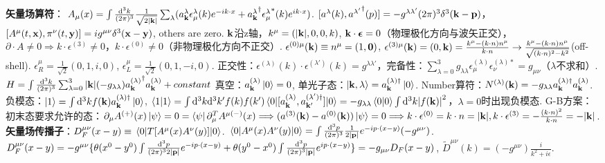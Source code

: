 \documentclass[11pt]{article}
\renewcommand{\bm}[1]{\boldsymbol{#1}}
\newcommand{\vbp}{\vb{p}}
\newcommand{\vbk}{\vb{k}}
\newcommand{\la}{\lambda}
\newcommand{\pa}{\partial}
\begin{document}
{\bf 矢量场算符}： $A_{\mu}(x)=\int\frac{\dd^3k}{(2\pi)^3}\frac{1}{\sqrt{2\abs{\vb{k}}}}\sum_{\la}(a^{\la}_{\vbk}\epsilon^{\la}_{\mu}(k)e^{-ik\cdot x}+{a^{\la}_{\vbk}}^{\dagger}{\epsilon^{\la}_{\mu}}^*(k)e^{ik\cdot x})$. $[a^{\la}(k),{a^{\la'}}^{\dagger}(p)]=-g^{\la\la'}(2\pi)^3\delta^3(\vb{k-p})$，$[A^{\mu}(t,\vb{x}),\pi^{\nu}(t,\vb{y})]=ig^{\mu\nu}\delta^3(\vb{x-y})$, others are zero.  $\vb{k}$沿z轴，$k^{\mu}=(\abs{\vbk},0,0,k)$, $\vbk\cdot\bm{\epsilon}=0$（物理极化方向与波矢正交），$\pa\cdot A\neq0\Longrightarrow k\cdot\epsilon^{(3)}\neq0，k\cdot\epsilon^{(0)}\neq0$（非物理极化方向不正交）. $\epsilon^{(0)\mu}(\vbk)\equiv n^{\mu}=(1,\vb{0})$, $\epsilon^{(3)\mu}(\vbk)=(0,\vbk)=\frac{k^{\mu}-(k\cdot n)n^{\mu}}{k\cdot n}\rightarrow\frac{k^{\mu}-(k\cdot n)n^{\mu}}{\sqrt{(k\cdot n)^2-k^2}}$(off-shell). $\epsilon_R^{\mu}=\frac{1}{\sqrt{2}}(0,1,i,0)$, $\epsilon_L^{\mu}=\frac{1}{\sqrt{2}}(0,1,-i,0)$.
正交性：$\epsilon^{(\la)}(k)\cdot\epsilon^{(\la')}(k)=g^{\la\la'}$，完备性：$\sum_{\la=0}^3g_{\la\la}\epsilon^{(\la)}_{\mu}\epsilon^{(\la)*}_{\nu}=g_{\mu\nu}$（$\la$不求和）.
$H=\int\frac{\dd^3k}{(2\pi)^3}\sum_{\la=0}^3\abs{\vbk}(-g_{\la\la}){a^{(\la)}_{\vbk}}^{\dagger}a^{(\la)}_{\vbk}+constant$
真空：$a^{(\la)}_{\vbk}\ket{0}=0$, 单光子态：$\ket{\vbk,\la}=a^{(\la)\dagger}_{\vbk}\ket{0}$. Number算符：$N^{(\la)}(\vbk)=-g_{\la\la}a^{(\la)\dagger}_{\vbk}a^{(\la)}_{\vbk}$.
负模态：$\ket{1}=\int\dd^3kf(\vbk)a^{(\la)\dagger}_{\vbk}\ket{0}$, $\braket{1}{1}=\int\dd^3k\dd^3k'f(k)f(k')\mel{0}{[a^{(\la)}_{\vbk},a^{(\la')\dagger}_{\vbk'}]}{0}=-g_{\la\la}\braket{0}{0}\int\dd^3k\abs{f(\vbk)}^2$，$\la=0$时出现负模态.
G-B方案：初末态要求允许的态：$\pa_{\mu}A^{(+)}(x)\ket{\psi}=0=\bra{\psi}\pa_{\mu}^TA^{\mu(-)}(x)\Longrightarrow(a^{(3)}(\vbk)-a^{(0)}(\vbk))\ket{\psi}=0\Longrightarrow k\cdot\epsilon^{(0)}=k\cdot n=\abs{\vbk},k\cdot\epsilon^{(3)}=-\frac{(k\cdot n)^2}{k\cdot n}=-\abs{\vbk}$.
{\bf 矢量场传播子}：$D^{\mu\nu}_F(x-y)\equiv\mel{0}{T[A^{\mu}(x)A^{\nu}(y)]}{0}$. $\mel{0}{A^{\mu}(x)A^{\nu}(y)}{0}=\int\frac{\dd^3p}{(2\pi)^3}\frac{1}{2\abs{\vbp}}e^{-ip\cdot(x-y)}(-g^{\mu\nu})$. $D^{\mu\nu}_F(x-y)=-g^{\mu\nu}\{\theta(x^0-y^0)\int\frac{\dd^3p}{(2\pi)^32\abs{\vbp}}e^{-ip\cdot(x-y)}+\theta(y^0-x^0)\int\frac{\dd^3p}{(2\pi)^3\abs{\vbp}}e^{ip\cdot(x-y)}\}=-g_{\mu\nu}D_F(x-y)$, $\tilde D^{\mu\nu}(k)=(-g^{\mu\nu})\frac{i}{k^2+i\epsilon}$.
\end{document}

